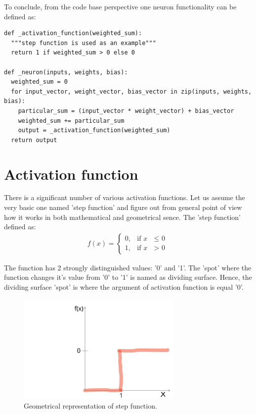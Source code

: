 To conclude, from the code base perspective one neuron functionality can be defined as:
\begin{lstlisting}
def _activation_function(weighted_sum):
  """step function is used as an example"""
  return 1 if weighted_sum > 0 else 0

def _neuron(inputs, weights, bias):
  weighted_sum = 0
  for input_vector, weight_vector, bias_vector in zip(inputs, weights, bias):
    particular_sum = (input_vector * weight_vector) + bias_vector
    weighted_sum += particular_sum
    output = _activation_function(weighted_sum)
  return output
\end{lstlisting}

      
\section{Activation function}
There is a significant number of various activation functions. Let us assume the very basic one named 'step function' and figure out from general point of view how it works in both mathematical and geometrical sence.   
The 'step function' defined as:
\begin{align*}
f(x) = \begin{cases} 0, & \mbox{if } x\mbox{ $\leq$ 0} \\ 1, & \mbox{if } x\mbox{ $>$ 0} \end{cases}
\end{align*}

The function has 2 strongly distinguished values: '0' and '1'. The 'spot' where the function changes it's value from '0' to '1' is named as dividing surface. Hence, the dividing surface 'spot' is where the argument of activation function is equal '0'.

\begin{figure}[h]
    \centering \includegraphics[width=8cm]{images/step_function.jpg}
    \caption {Geometrical representation of step function.}
\end{figure}

